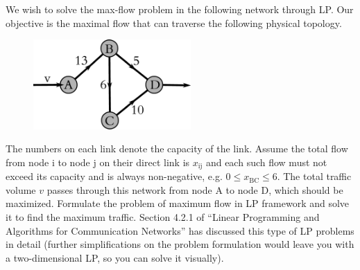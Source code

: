 \documentclass[10pt,letterpaper]{article}
\begin{document}
We wish to solve the max-flow problem in the following network through LP. Our objective is the maximal flow that can traverse the following physical topology.
\begin{figure}[h]
\centering
\includegraphics[width=60mm]{max_flow.eps}
\end{figure}
The numbers on each link denote the capacity of the link. Assume the total flow from node i to node j on their direct link is $x_\text{ij}$ and each such flow must not exceed its capacity and is always non-negative, e.g.
$
0\le x_\text{BC} \le 6.
$
The total traffic volume $v$ passes through this network from node A to node D, which should be maximized. Formulate the problem of maximum flow in LP framework and solve it to find the maximum traffic. Section 4.2.1 of ``Linear Programming and Algorithms for Communication Networks'' has discussed this type of LP problems in detail (further simplifications on the problem formulation would leave you with a two-dimensional LP, so you can solve it visually).
\end{document}
